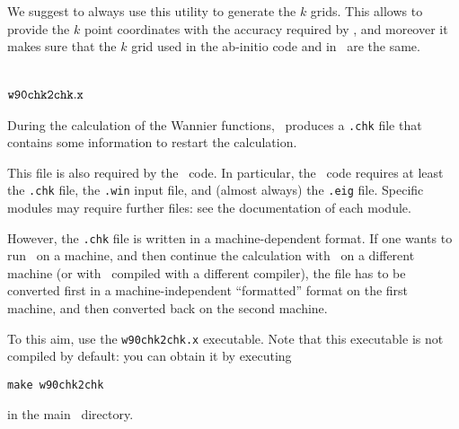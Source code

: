 We suggest to always use this utility to generate the $k$ grids. This
allows to
provide the $k$ point coordinates with the accuracy required by
\wannier, and moreover it
makes sure that the $k$ grid used in the ab-initio code and in
\wannier\ are the same.

\section{$\tt{w90chk2chk.x}$\label{sec:w90chk2chk}}
During the calculation of the Wannier functions, \wannier\ produces a
\verb|.chk| file that contains some information to restart the
calculation.

This file is also required by the \postw\ code. 
In particular, the \postw\ code requires at least the \verb|.chk| file, the
\verb|.win| input file, and (almost always) the \verb|.eig|
file. Specific modules may require further files: see the
documentation of each module.

However, the \verb|.chk| file is
written in a machine-dependent format. If one wants to run \wannier\
on a machine, and then continue the calculation with \postw\ on a
different machine (or with \postw\ compiled with a different compiler), the file has to be
converted first in a machine-independent ``formatted'' format on the
first machine, and
then converted back on the second machine.

To this aim, use the \verb|w90chk2chk.x| executable. Note that this
executable is not compiled by default: you can obtain it by executing 
\begin{verbatim}
make w90chk2chk
\end{verbatim}
in the main \wannier\ directory.

